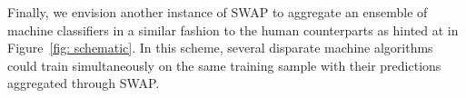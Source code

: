 \documentclass[twocolumn]{aastex6}
\begin{document}

Finally, we envision another instance of SWAP to aggregate an ensemble of machine classifiers in a similar fashion to the human counterparts as hinted at in Figure~\ref{fig: schematic}.
In this scheme, several disparate machine algorithms could train simultaneously 
on the same training sample with their predictions aggregated through SWAP. 


\end{document}
